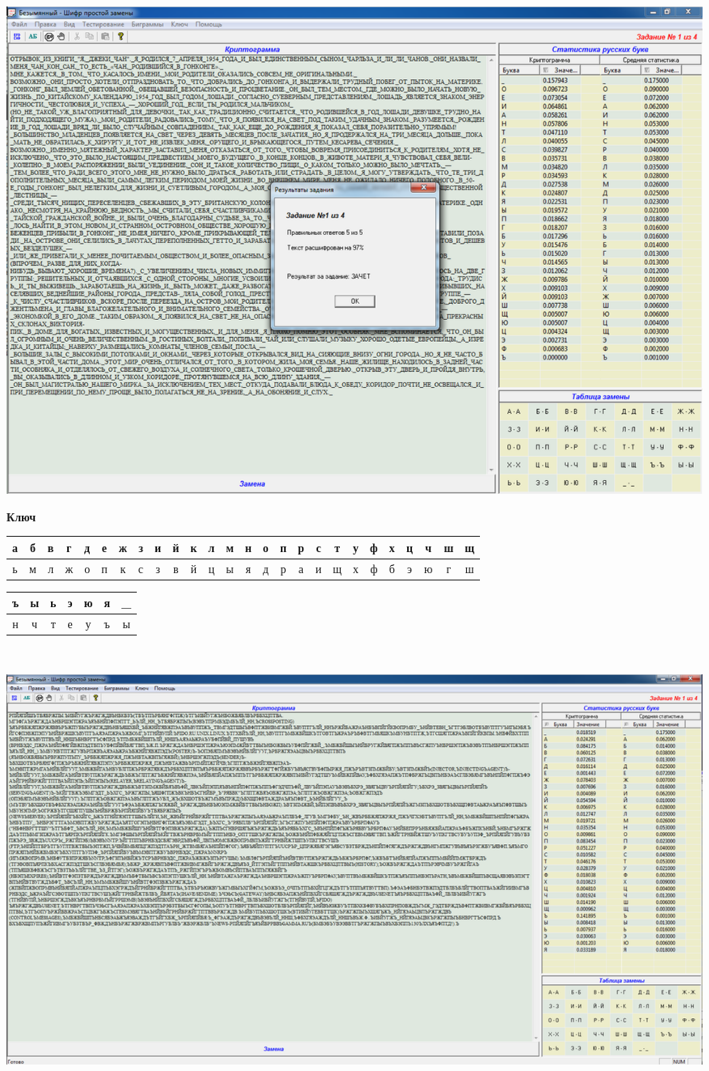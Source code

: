 \documentclass[a4paper,14pt]{extarticle}
\begin{document}
    \begin{center}
        \includegraphics[scale=0.3]{pics/2_2.png}
    \end{center}
    \begin{center}
        \textbf{Ключ}
    \end{center}
    \vspace{-3em}
    \begin{center}
        \begin{tabular}{|c|c|c|c|c|c|c|c|c|c|c|c|c|c|c|c|c|c|c|c|c|c|c|c|c|c|}
            \hline
            а & б & в & г & д & е & ж & з & и & й & к & л & м & н & о & п & р & с & т & у & ф & х & ц & ч & ш & щ  \\
            \hline
            ь & м & л & ж & о & п & к & с & з & в & й & ц & ы & я & д & р & а & и & щ & х & ф & б & э & ю & г & ш   \\
            \hline
        \end{tabular}
    \end{center}
    \begin{tabular}{|c|c|c|c|c|c|c|}
        \hline
        ъ & ы & ь & э & ю & я & \_ \\
        \hline
        н & ч & т & е & у & ъ & ы \\
        \hline
    \end{tabular}\\
    \begin{center}
        \includegraphics[scale=0.3]{pics/3.png}
    \end{center}
\end{document}
